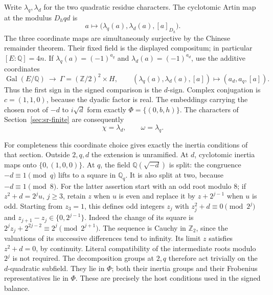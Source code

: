 Write \(\lambda_q,\lambda_d\) for the two quadratic residue
characters.  The cyclotomic Artin map at the modulus \(D_hqd\) is
\[
 a\longmapsto \bigl(\lambda_q(a),\lambda_d(a),[a]_{D_h}\bigr).
\]
The three coordinate maps are simultaneously surjective by the Chinese
remainder theorem.  Their fixed field is the displayed compositum;
in particular \([E:\mathbb Q]=4n\).  If
\(\lambda_q(a)=(-1)^{a_q}\) and
\(\lambda_d(a)=(-1)^{a_d}\), use the additive coordinates
\begin{equation}\label{eq:sr-host-coordinate-swap}
 \operatorname{Gal}(E/\mathbb Q)\ \longrightarrow\
       \Gamma=(\mathbb Z/2)^2\times H,\qquad
 (\lambda_q(a),\lambda_d(a),[a])\longmapsto(a_d,a_q,[a]).
\end{equation}
Thus the first sign in the signed comparison is the \(d\)-sign.
Complex conjugation is \(c=(1,1,0)\), because the dyadic factor is real.
The embeddings carrying the chosen root of \(-d\) to \(i\sqrt d\)
form exactly \(\Phi=\{(0,b,h)\}\).  The characters of
Section~\ref{sec:sr-finite} are consequently
\[
                   \chi=\lambda_d,\qquad \omega=\lambda_q .
\]

For completeness this coordinate choice gives exactly the inertia
conditions of that section.  Outside \(2,q,d\) the extension is
unramified.  At \(d\), cyclotomic inertia maps onto
\(\{0,(1,0,0)\}\).  At \(q\), the field
\(\mathbb Q(\sqrt{-d})\) is split: the congruence
\(-d\equiv1\pmod q\) lifts to a square in \(\mathbb Q_q\).
It is also split at two, because \(-d\equiv1\pmod8\).
For the latter assertion start with an odd root modulo \(8\);
if \(z^2+d=2^j u\), \(j\geq3\), retain \(z\) when \(u\)
is even and replace it by \(z+2^{j-1}\) when \(u\) is odd.
Starting from \(z_3=1\), this defines odd integers \(z_j\) with
\(z_j^2+d\equiv0\pmod{2^j}\) and
\(z_{j+1}-z_j\in\{0,2^{j-1}\}\).
Indeed the change of its square is
\(2^jz_j+2^{2j-2}\equiv2^j\pmod{2^{j+1}}\).
The sequence is Cauchy in \(\mathbb Z_2\), since the valuations of
its successive differences tend to infinity.
Its limit \(z\) satisfies \(z^2+d=0\), by continuity.
Literal compatibility of the intermediate roots modulo \(2^j\)
is not required.
The decomposition groups at \(2,q\) therefore act trivially on the
\(d\)-quadratic subfield.  They lie in \(\Phi\); both their inertia
groups and their Frobenius representatives lie in \(\Phi\).
These are precisely the host conditions used in the signed balance.

